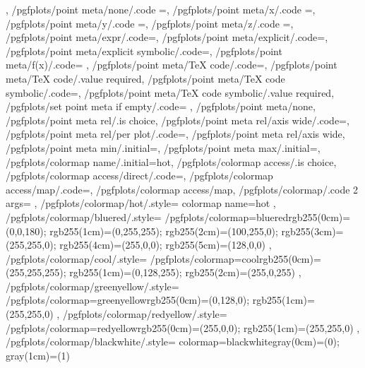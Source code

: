{{	},%
	/pgfplots/point meta/none/.code	={},%
	/pgfplots/point meta/x/.code	={},%
	/pgfplots/point meta/y/.code	={},%
	/pgfplots/point meta/z/.code	={},%
	/pgfplots/point meta/expr/.code={},%
	/pgfplots/point meta/explicit/.code={},%
	/pgfplots/point meta/explicit symbolic/.code={},%
	/pgfplots/point meta/f(x)/.code={
		\ifpgfplots@curplot@threedim
		\else
		\fi
	},
	/pgfplots/point meta/TeX code/.code={},%
	/pgfplots/point meta/TeX code/.value required,
	/pgfplots/point meta/TeX code symbolic/.code={},%
	/pgfplots/point meta/TeX code symbolic/.value required,
	/pgfplots/set point meta if empty/.code={%
		\ifx\pgfplotspointmetainputhandler\pgfutil@empty
		\fi
	},%
	/pgfplots/point meta/none,
	/pgfplots/point meta rel/.is choice,
	/pgfplots/point meta rel/axis wide/.code={\def\pgfplots@perpointmeta@rel@choice{0}},%
	/pgfplots/point meta rel/per plot/.code={\def\pgfplots@perpointmeta@rel@choice{1}},%
	/pgfplots/point meta rel/axis wide,%
	/pgfplots/point meta min/.initial=,%
	/pgfplots/point meta max/.initial=,%
	/pgfplots/colormap name/.initial=hot,
	/pgfplots/colormap access/.is choice,
	/pgfplots/colormap access/direct/.code={\def\pgfplots@colormap@access{d}},%
	/pgfplots/colormap access/map/.code={\def\pgfplots@colormap@access{m}},%
	/pgfplots/colormap access/map,%
	/pgfplots/colormap/.code 2 args={%
	},
	/pgfplots/colormap/hot/.style={
		colormap name=hot
	},
	/pgfplots/colormap/bluered/.style={
		/pgfplots/colormap={bluered}{rgb255(0cm)=(0,0,180); rgb255(1cm)=(0,255,255); rgb255(2cm)=(100,255,0); rgb255(3cm)=(255,255,0); rgb255(4cm)=(255,0,0); rgb255(5cm)=(128,0,0)}
	},
	/pgfplots/colormap/cool/.style={
		/pgfplots/colormap={cool}{rgb255(0cm)=(255,255,255); rgb255(1cm)=(0,128,255); rgb255(2cm)=(255,0,255)}
	},
	/pgfplots/colormap/greenyellow/.style={
		/pgfplots/colormap={greenyellow}{rgb255(0cm)=(0,128,0); rgb255(1cm)=(255,255,0)}
	},
	/pgfplots/colormap/redyellow/.style={
		/pgfplots/colormap={redyellow}{rgb255(0cm)=(255,0,0); rgb255(1cm)=(255,255,0)}
	},
	/pgfplots/colormap/blackwhite/.style={
		colormap={blackwhite}{gray(0cm)=(0); gray(1cm)=(1)}
}}
